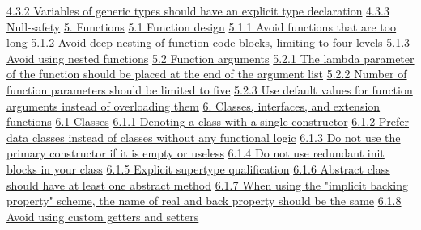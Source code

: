 \hspace{1.0cm}\hyperref[sec:4.3.2]{ 4.3.2 Variables of generic types should have an explicit type declaration}
\hspace{1.0cm}\hyperref[sec:4.3.3]{ 4.3.3 Null-safety}
\hspace{0.0cm}\hyperref[sec:5.]{5. Functions}
\hspace{0.5cm}\hyperref[sec:5.1]{ 5.1 Function design}
\hspace{1.0cm}\hyperref[sec:5.1.1]{ 5.1.1 Avoid functions that are too long }
\hspace{1.0cm}\hyperref[sec:5.1.2]{ 5.1.2 Avoid deep nesting of function code blocks, limiting to four levels}
\hspace{1.0cm}\hyperref[sec:5.1.3]{ 5.1.3 Avoid using nested functions}
\hspace{0.5cm}\hyperref[sec:5.2]{ 5.2 Function arguments}
\hspace{1.0cm}\hyperref[sec:5.2.1]{ 5.2.1 The lambda parameter of the function should be placed at the end of the argument list}
\hspace{1.0cm}\hyperref[sec:5.2.2]{ 5.2.2 Number of function parameters should be limited to five}
\hspace{1.0cm}\hyperref[sec:5.2.3]{ 5.2.3 Use default values for function arguments instead of overloading them}
\hspace{0.0cm}\hyperref[sec:6.]{6. Classes, interfaces, and extension functions}
\hspace{0.5cm}\hyperref[sec:6.1]{ 6.1 Classes}
\hspace{1.0cm}\hyperref[sec:6.1.1]{ 6.1.1 Denoting a class with a single constructor}
\hspace{1.0cm}\hyperref[sec:6.1.2]{ 6.1.2 Prefer data classes instead of classes without any functional logic}
\hspace{1.0cm}\hyperref[sec:6.1.3]{ 6.1.3 Do not use the primary constructor if it is empty or useless}
\hspace{1.0cm}\hyperref[sec:6.1.4]{ 6.1.4 Do not use redundant init blocks in your class}
\hspace{1.0cm}\hyperref[sec:6.1.5]{ 6.1.5 Explicit supertype qualification}
\hspace{1.0cm}\hyperref[sec:6.1.6]{ 6.1.6 Abstract class should have at least one abstract method}
\hspace{1.0cm}\hyperref[sec:6.1.7]{ 6.1.7 When using the "implicit backing property" scheme, the name of real and back property should be the same}
\hspace{1.0cm}\hyperref[sec:6.1.8]{ 6.1.8 Avoid using custom getters and setters}
